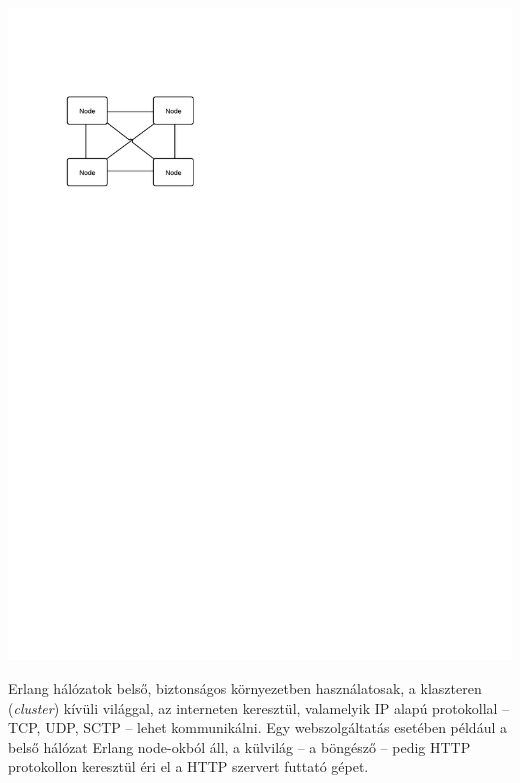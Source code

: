 \documentclass[12pt, a4paper, oneside]{book}
\begin{document}
\includegraphics[clip=true, trim= 0 20cm 0 3cm]{fig/Nodes.pdf}

Erlang hálózatok belső, biztonságos környezetben használatosak, a klaszteren
(\emph{cluster}) kívüli világgal, az interneten keresztül, valamelyik IP alapú
protokollal -- TCP, UDP, SCTP -- lehet kommunikálni. Egy webszolgáltatás
esetében például a belső hálózat Erlang node-okból áll, a külvilág -- a
böngésző -- pedig HTTP protokollon keresztül éri el a HTTP szervert futtató
gépet. 
\end{document}
